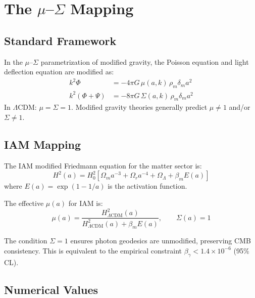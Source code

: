 \documentclass[11pt,letterpaper]{article}
\begin{document}
\section{The $\mu$--$\Sigma$ Mapping}

\subsection{Standard Framework}

In the $\mu$--$\Sigma$ parametrization of modified gravity, the Poisson equation and light deflection equation are modified as:
\begin{align}
k^2 \Phi &= -4\pi G\, \mu(a,k)\, \rho_m \delta_m a^2 \label{eq:poisson}\\
k^2(\Phi + \Psi) &= -8\pi G\, \Sigma(a,k)\, \rho_m \delta_m a^2 \label{eq:deflection}
\end{align}
In $\Lambda$CDM: $\mu = \Sigma = 1$. Modified gravity theories generally predict $\mu \neq 1$ and/or $\Sigma \neq 1$.

\subsection{IAM Mapping}

The IAM modified Friedmann equation for the matter sector is:
\begin{equation}
H^2(a) = H_0^2\left[\Omega_m a^{-3} + \Omega_r a^{-4} + \Omega_\Lambda + \beta_m E(a)\right]
\end{equation}
where $E(a) = \exp(1 - 1/a)$ is the activation function.

The effective $\mu(a)$ for IAM is:
\begin{equation}
\boxed{\mu(a) = \frac{H^2_{\Lambda\text{CDM}}(a)}{H^2_{\Lambda\text{CDM}}(a) + \beta_m E(a)}, \qquad \Sigma(a) = 1}
\label{eq:mu_iam}
\end{equation}

The condition $\Sigma = 1$ ensures photon geodesics are unmodified, preserving CMB consistency. This is equivalent to the empirical constraint $\beta_\gamma < 1.4 \times 10^{-6}$ (95\% CL).

\subsection{Numerical Values}
\end{document}
